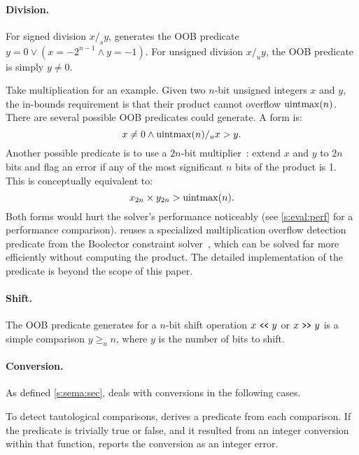 \paragraph{Division.}
For signed division $x /_s y$, \sys generates the OOB predicate
$y = 0 \lor (x = -2^{n-1} \land y = -1)$.
For unsigned division $x /_u y$, the OOB predicate is simply
$y \neq 0$.

Take multiplication for an example.  Given two $n$-bit unsigned
integers $x$ and $y$, the in-bounds requirement is that their product
cannot overflow $\operatorname{uintmax}(n)$.  There are several possible OOB
predicates \sys could generate.
A \naive form is:
\begin{equation*}
x \neq 0 \land \operatorname{uintmax}(n) /_u x > y.
\end{equation*}
Another possible predicate is to use a $2n$-bit
multiplier~\cite{molnar:catchconv}: extend $x$ and $y$ to $2n$ bits
and flag an error if any of the most significant $n$ bits of the
product is 1.  This is conceptually equivalent to:
\begin{equation*}
x_{2n} \times y_{2n} > \operatorname{uintmax}(n).
\end{equation*}
Both forms would hurt the solver's performance noticeably
(see \autoref{s:eval:perf} for a performance comparison).
%
\sys reuses a specialized multiplication overflow detection predicate
from the Boolector constraint
solver~\cite[\chapterautorefname~3.5]{brummayer:phd}, which can be
solved far more efficiently without computing the product.  The
detailed implementation of the predicate is beyond the scope of
this paper.
\fi

\paragraph{Shift.}
The OOB predicate \sys generates for a $n$-bit shift operation
$x \shl y$ or $x \shr y$ is a simple comparison $y \geq_u n$, where
$y$ is the number of bits to shift.

\paragraph{Conversion.}
As defined \autoref{s:sema:sec}, \sys deals with conversions
in the following cases.

To detect tautological comparisons, \sys derives a predicate from
each comparison.  If the predicate is trivially true or false,
and it resulted from an integer conversion within that function, \sys
reports the conversion as an integer error.

